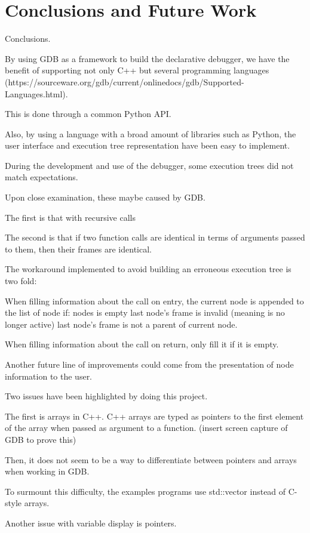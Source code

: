 \chapter{Conclusions and Future Work}
\label{cap:conclusions}

Conclusions.

By using GDB as a framework to build the declarative debugger, we have the benefit of supporting not only C++ but 
several programming languages 
(https://sourceware.org/gdb/current/onlinedocs/gdb/Supported-Languages.html).

This is done through a common Python API.

Also, by using a language with a broad amount of libraries such as Python, the user interface and execution tree representation have been easy to implement.

During the development and use of the debugger, some execution trees did not match expectations.

Upon close examination, these maybe caused by GDB.

The first is that with recursive calls

The second is that if two function calls are identical in terms of arguments passed to them, then their frames are identical.

The workaround implemented to avoid building an erroneous execution tree is two fold:

When filling information about the call on entry, the current node is appended to the list of node if:
nodes is empty
last node's frame is invalid (meaning is no longer active)
last node's frame is not a parent of current node.

When filling information about the call on return, only fill it if it is empty.

Another future line of improvements could come from the presentation of node information to the user.

Two issues have been highlighted by doing this project.

The first is arrays in C++. C++ arrays are typed as pointers to the first element of the array when passed as argument to a function. (insert screen capture of GDB to prove this)

Then, it does not seem to be a way to differentiate between pointers and arrays when working in GDB.

To surmount this difficulty, the examples programs use std::vector instead of C-style arrays.

Another issue with variable display is pointers.

